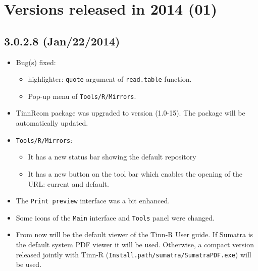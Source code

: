 
\section{Versions released in 2014 (01)}
\subsection*{3.0.2.8 (Jan/22/2014)}
\begin{itemize}
  \item Bug(s) fixed:
    \begin{itemize}
      \item \RR{} highlighter: \texttt{quote} argument of \texttt{read.table} function.
      \item Pop-up menu of \texttt{Tools/R/Mirrors}.
    \end{itemize}
  \item TinnRcom package was upgraded to version (1.0-15).
   The package will be automatically updated.
  \item \texttt{Tools/R/Mirrors}:
    \begin{itemize}
       \item It has a new status bar showing the default repository
       \item It has a new button on the tool bar which enables the opening of the
             URL: current and default.
    \end{itemize}
  \item The \texttt{Print preview} interface was a bit enhanced.
  \item Some icons of the \texttt{Main} interface and \texttt{Tools} panel were changed.
  \item From now 
   will be the default viewer of the Tinn-R User guide.
   If Sumatra is the default system PDF viewer it will be used. Otherwise, a compact version
   released jointly with Tinn-R (\texttt{Install.path/sumatra/SumatraPDF.exe}) will be used.
\end{itemize}